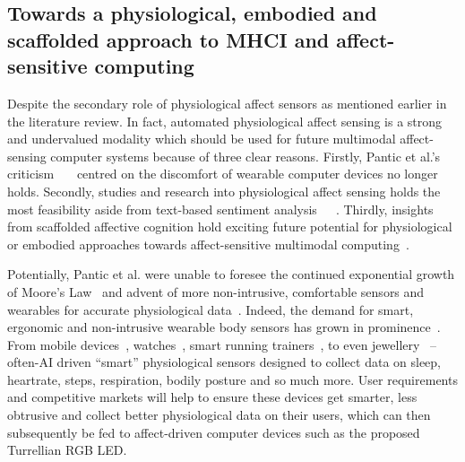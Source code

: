 \documentclass{sigchi}
\begin{document}
\subsection{Towards a physiological, embodied and scaffolded approach to MHCI and affect-sensitive computing}

Despite the secondary role of physiological affect sensors as mentioned earlier in the literature review. In fact, automated physiological affect sensing is a strong and undervalued modality which should be used for future multimodal affect-sensing computer systems because of three clear reasons. Firstly, Pantic et al.’s criticism~\cite{pantic2003toward}~\cite{pantic2008human}~\cite{6634207} centred on the discomfort of wearable computer devices no longer holds. Secondly, studies and research into physiological affect sensing holds the most feasibility aside from text-based sentiment analysis~\cite{goshvarpour2017fusion}~\cite{goshvarpour2017indices}~\cite{goshvarpour2017discrimination}. Thirdly, insights from scaffolded affective cognition hold exciting future potential for physiological or embodied approaches towards affect-sensitive multimodal computing~\cite{colombetti2015scaffoldings}. 

Potentially, Pantic et al. were unable to foresee the continued exponential growth of Moore’s Law~\cite{} and advent of more non-intrusive, comfortable sensors and wearables for accurate physiological data~\cite{chen2012making}. Indeed, the demand for smart, ergonomic and non-intrusive wearable body sensors has grown in prominence~\cite{chen2012making}. From mobile devices~\cite{}, watches~\cite{kim2015acceptance}, smart running trainers~\cite{hurford2009types}, to even jewellery~\cite{ju2015smart} – often-AI driven “smart” physiological sensors designed to collect data on sleep, heartrate, steps, respiration, bodily posture and so much more. User requirements and competitive markets will help to ensure these devices get smarter, less obtrusive and collect better physiological data on their users, which can then subsequently be fed to affect-driven computer devices such as the proposed Turrellian RGB LED. 
\end{document}
